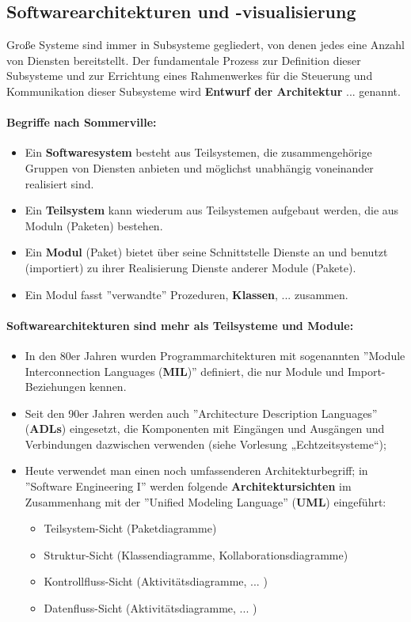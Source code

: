 \subsection{Softwarearchitekturen und -visualisierung}
Große Systeme sind immer in Subsysteme gegliedert, von denen jedes eine Anzahl von Diensten bereitstellt. Der fundamentale Prozess zur Definition dieser Subsysteme und zur Errichtung eines Rahmenwerkes für die Steuerung und Kommunikation dieser Subsysteme wird \textbf{Entwurf der Architektur} ... genannt.

\paragraph{Begriffe nach Sommerville:}
\begin{itemize}
	\item Ein \textbf{Softwaresystem} besteht aus Teilsystemen, die zusammengehörige Gruppen von Diensten anbieten und möglichst unabhängig voneinander realisiert sind.
	\item Ein \textbf{Teilsystem} kann wiederum aus Teilsystemen aufgebaut werden, die aus Moduln (Paketen) bestehen.
	\item Ein \textbf{Modul} (Paket) bietet über seine Schnittstelle Dienste an und benutzt (importiert) zu ihrer Realisierung Dienste anderer Module (Pakete).
	\item Ein Modul fasst ''verwandte'' Prozeduren, \textbf{Klassen}, ... zusammen.
\end{itemize}

\paragraph{Softwarearchitekturen sind mehr als Teilsysteme und Module:}
\begin{itemize}
	\item In den 80er Jahren wurden Programmarchitekturen mit sogenannten ''Module Interconnection Languages (\textbf{MIL})'' definiert, die nur Module und Import-Beziehungen kennen.
	\item Seit den 90er Jahren werden auch ''Architecture Description Languages'' (\textbf{ADLs}) eingesetzt, die Komponenten mit Eingängen und Ausgängen und Verbindungen dazwischen verwenden (siehe Vorlesung „Echtzeitsysteme“);
	\item Heute verwendet man einen noch umfassenderen Architekturbegriff; in ''Software Engineering I'' werden folgende \textbf{Architektursichten} im Zusammenhang mit der ''Unified Modeling Language'' (\textbf{UML}) eingeführt:
	\begin{itemize}
		\item Teilsystem-Sicht (Paketdiagramme)
		\item Struktur-Sicht (Klassendiagramme, Kollaborationsdiagramme)
		\item Kontrollfluss-Sicht (Aktivitätsdiagramme, ... )
		\item Datenfluss-Sicht (Aktivitätsdiagramme, ... )
	\end{itemize}
\end{itemize}

